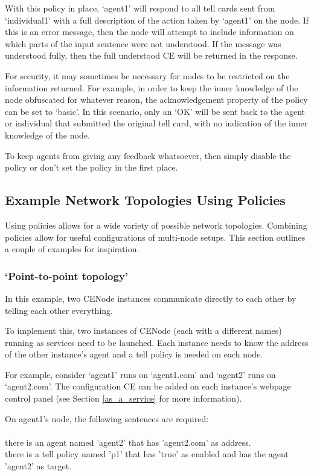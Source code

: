 \documentclass{scrartcl}
\newcommand{\ce}[1]{\textsf{#1}}
\begin{document}
With this policy in place, `agent1' will respond to all \ce{tell card}s sent from `individual1' with a full description of the action taken by `agent1' on the node. If this is an error message, then the node will attempt to include information on which parts of the input sentence were not understood. If the message was understood fully, then the full understood CE will be returned in the response.

For security, it may sometimes be necessary for nodes to be restricted on the information returned. For example, in order to keep the inner knowledge of the node obfuscated for whatever reason, the \ce{acknowledgement} property of the policy can be set to `basic'. In this scenario, only an `OK' will be sent back to the agent or individual that submitted the original tell card, with no indication of the inner knowledge of the node.

To keep agents from giving any feedback whatsoever, then simply disable the policy or don't set the policy in the first place.

\subsection{Example Network Topologies Using Policies}
Using policies allows for a wide variety of possible network topologies. Combining policies allow for useful configurations of multi-node setups. This section outlines a couple of examples for inspiration.

\subsubsection{`Point-to-point topology'}
In this example, two CENode instances communicate directly to each other by telling each other everything.

To implement this, two instances of CENode (each with a different names) running as services need to be launched. Each instance needs to know the address of the other instance's agent and a tell policy is needed on each node.

For example, consider `agent1' runs on `agent1.com' and `agent2' runs on `agent2.com'. The configuration CE can be added on each instance's webpage control panel (see Section \ref{as_a_service} for more information).

On agent1's node, the following sentences are required:\\
\\\ce{there is an agent named 'agent2' that has 'agent2.com' as address.\\
there is a tell policy named 'p1' that has 'true' as enabled and has the agent 'agent2' as target.}\\
\end{document}

